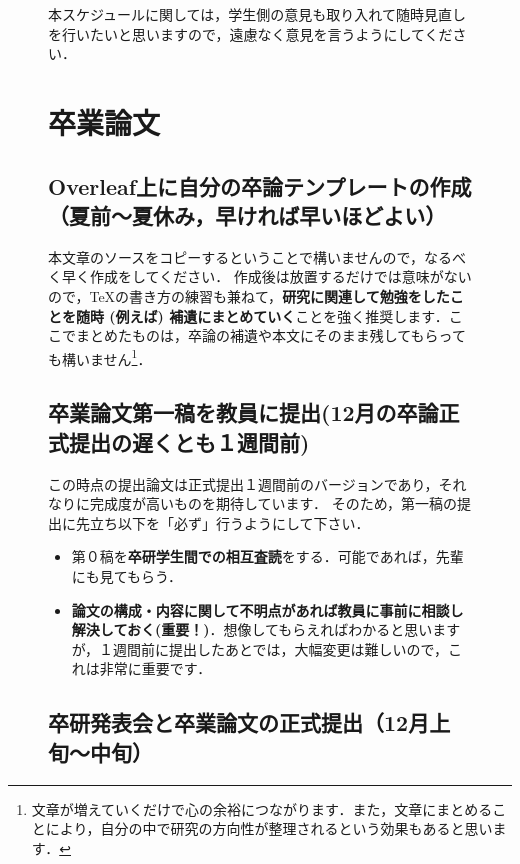 \documentclass[dvipdfmx,autodetect-engine]{jsreport}
\begin{document}
\begin{figure}[h]
{本スケジュールに関しては，学生側の意見も取り入れて随時見直しを行いたいと思いますので，遠慮なく意見を言うようにしてください．

\section{卒業論文}


\subsection{Overleaf上に自分の卒論テンプレートの作成（夏前〜夏休み，早ければ早いほどよい）}

本文章のソースをコピーするということで構いませんので，なるべく早く作成をしてください．
作成後は放置するだけでは意味がないので，\TeX の書き方の練習も兼ねて，\textbf{研究に関連して勉強をしたことを随時 (例えば) 補遺にまとめていく}ことを強く推奨します．ここでまとめたものは，卒論の補遺や本文にそのまま残してもらっても構いません\footnote{文章が増えていくだけで心の余裕につながります．また，文章にまとめることにより，自分の中で研究の方向性が整理されるという効果もあると思います．}．

\subsection{卒業論文第一稿を教員に提出(12月の卒論正式提出の遅くとも１週間前)}

この時点の提出論文は正式提出１週間前のバージョンであり，それなりに完成度が高いものを期待しています．
そのため，第一稿の提出に先立ち以下を「必ず」行うようにして下さい．
\begin{itemize}
\item 第０稿を\textbf{卒研学生間での相互査読}をする．可能であれば，先輩にも見てもらう．
\item \textbf{論文の構成・内容に関して不明点があれば教員に事前に相談し解決しておく(重要！)}．想像してもらえればわかると思いますが，１週間前に提出したあとでは，大幅変更は難しいので，これは非常に重要です．
\end{itemize}

\subsection{卒研発表会と卒業論文の正式提出（12月上旬〜中旬）}

}
\end{figure}
\end{document}
